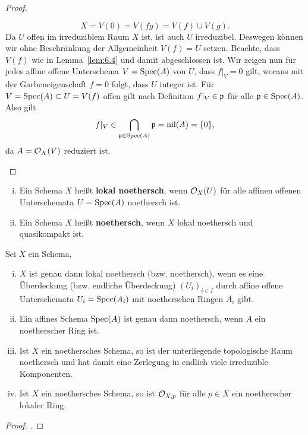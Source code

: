 \begin{prop}
\begin{proof}
\begin{enumerate}[i)]
			\[
				X = V(0) = V(fg) = V(f) \cup V(g).
			\]
			Da $U$ offen im irreduziblem Raum $X$ ist, ist auch $U$ irreduzibel. Deswegen können wir ohne Beschränkung der Allgemeinheit $V(f) = U$ setzen. Beachte, dass $V(f)$ wie in Lemma~\ref{lem:6.4} und damit abgeschlossen ist. Wir zeigen nun für jedes affine offene Unterschema $V=\operatorname{Spec}(A)$ von $U$, dass $f\vert_V = 0$ gilt, woraus mit der Garbeneigenschaft $f=0$ folgt, dass $U$ integer ist. Für $V=\operatorname{Spec}(A) \subset U = V(f)$ offen gilt nach Definition $f\vert_V \in \mathfrak{p}$ für alle $\mathfrak{p} \in \operatorname{Spec}(A)$. Also gilt
			\[
				f\vert_V \in \bigcap_{\mathfrak{p} \in \operatorname{Spec}(A)} \mathfrak{p} = \operatorname{nil}(A) = \{0\},
			\]
			da $A = \mathcal{O}_X(V)$ reduziert ist.
		\end{enumerate}
	\end{proof}
\end{prop}

\begin{defn}
\label{defn:6.6}
	\begin{enumerate}[i)]
		\item Ein Schema $X$ heißt \textbf{lokal noethersch}, wenn $\mathcal{O}_{X}(U)$ für alle affinen offenen Unterschemata $U = \operatorname{Spec}(A)$ noethersch ist.
		\item Ein Schema $X$ heißt \textbf{noethersch}, wenn $X$ lokal noethersch und quasikompakt ist.
	\end{enumerate}
\end{defn}


\begin{prop}
\label{prop:6.7}
	Sei $X$ ein Schema.
	\begin{enumerate}[i)]
		\item $X$ ist genau dann lokal noethersch (bzw. noethersch), wenn es eine Überdeckung (bzw. endliche Überdeckung) $(U_i)_{i\in I}$ durch affine offene Unterschemata $U_i = \operatorname{Spec}(A_i)$ mit noetherschen Ringen $A_i$ gibt.
		\item Ein affines Schema $\operatorname{Spec}(A)$ ist genau dann noethersch, wenn $A$ ein noetherscher Ring ist.
		\item Ist $X$ ein noethersches Schema, so ist der unterliegende topologische Raum noethersch und hat damit eine Zerlegung in endlich viele irreduzible Komponenten.
		\item Ist $X$ ein noethersches Schema, so ist $\mathcal{O}_{X,p}$ für alle $p \in X$ ein noetherscher lokaler Ring.
	\end{enumerate}
	\begin{proof}
		\cite[Proposition II.3.2]{hartshorne1977algebraic}.
	\end{proof}
\end{prop}

